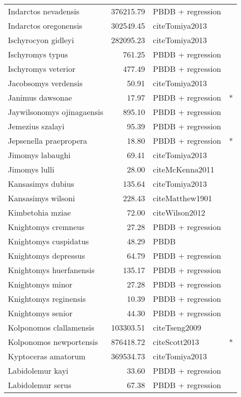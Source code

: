 \begin{table}[ht]
\begin{tabular}{lrll}
  Indarctos nevadensis & 376215.79 & PBDB + regression &  \\ 
  Indarctos oregonensis & 302549.45 & cite{Tomiya2013} &  \\ 
  Ischyrocyon gidleyi & 282095.23 & cite{Tomiya2013} &  \\ 
  Ischyromys typus & 761.25 & PBDB + regression &  \\ 
  Ischyromys veterior & 477.49 & PBDB + regression &  \\ 
  Jacobsomys verdensis & 50.91 & cite{Tomiya2013} &  \\ 
  Janimus dawsonae & 17.97 & PBDB + regression & * \\ 
  Jaywilsonomys ojinagaensis & 895.10 & PBDB + regression &  \\ 
  Jemezius szalayi & 95.39 & PBDB + regression &  \\ 
  Jepsenella praepropera & 18.80 & PBDB + regression & * \\ 
  Jimomys labaughi & 69.41 & cite{Tomiya2013} &  \\ 
  Jimomys lulli & 28.00 & cite{McKenna2011} &  \\ 
  Kansasimys dubius & 135.64 & cite{Tomiya2013} &  \\ 
  Kansasimys wilsoni & 228.43 & cite{Matthew1901} &  \\ 
  Kimbetohia mziae & 72.00 & cite{Wilson2012} &  \\ 
  Knightomys cremneus & 27.28 & PBDB + regression &  \\ 
  Knightomys cuspidatus & 48.29 & PBDB &  \\ 
  Knightomys depressus & 64.79 & PBDB + regression &  \\ 
  Knightomys huerfanensis & 135.17 & PBDB + regression &  \\ 
  Knightomys minor & 27.28 & PBDB + regression &  \\ 
  Knightomys reginensis & 10.39 & PBDB + regression &  \\ 
  Knightomys senior & 44.30 & PBDB + regression &  \\ 
  Kolponomos clallamensis & 103303.51 & cite{Tseng2009} &  \\ 
  Kolponomos newportensis & 876418.72 & cite{Scott2013} & * \\ 
  Kyptoceras amatorum & 369534.73 & cite{Tomiya2013} &  \\ 
  Labidolemur kayi & 33.60 & PBDB + regression &  \\ 
  Labidolemur serus & 67.38 & PBDB + regression &  \\ 

\end{tabular}
\end{table}
